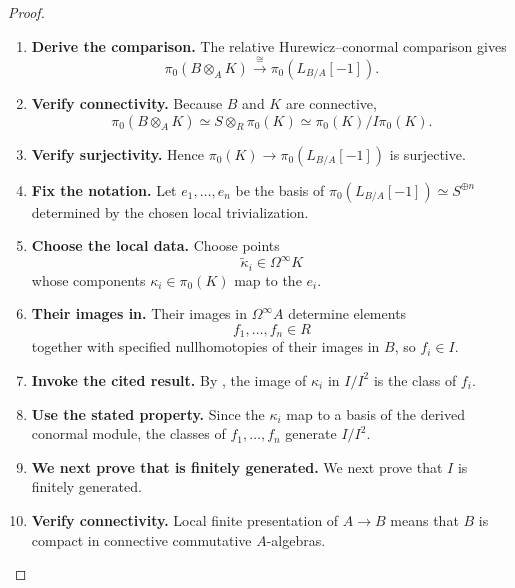 \begin{proof}
\begin{enumerate}[label=\textup{(\arabic*)}]
    \item \textbf{Derive the comparison.}
    The relative Hurewicz--conormal comparison gives
    \[
            \pi_0(B\otimes_AK)
            \xrightarrow{\cong}
            \pi_0(L_{B/A}[-1]).
        \]

    \item \textbf{Verify connectivity.}
    Because \(B\) and \(K\) are connective,
    \[
            \pi_0(B\otimes_AK)
            \simeq
            S\otimes_R\pi_0(K)
            \simeq
            \pi_0(K)/I\pi_0(K).
        \]

    \item \textbf{Verify surjectivity.}
    Hence \(\pi_0(K)\to\pi_0(L_{B/A}[-1])\) is surjective.

    \item \textbf{Fix the notation.}
    Let \(e_1,\ldots,e_n\) be the basis of \(\pi_0(L_{B/A}[-1])\simeq S^{\oplus n}\) determined by the chosen local trivialization.

    \item \textbf{Choose the local data.}
    Choose points
    \[
            \widetilde\kappa_i\in\Omega^\infty K
        \]
    whose components \(\kappa_i\in\pi_0(K)\) map to the \(e_i\).

    \item \textbf{Their images in.}
    Their images in \(\Omega^\infty A\) determine elements
    \[
            f_1,\ldots,f_n\in R
        \]
    together with specified nullhomotopies of their images in \(B\), so \(f_i\in I\).

    \item \textbf{Invoke the cited result.}
    By , the image of \(\kappa_i\) in \(I/I^2\) is
    the class of \(f_i\).

    \item \textbf{Use the stated property.}
    Since the \(\kappa_i\) map to a basis of the derived conormal module, the classes of
    \(f_1,\ldots,f_n\) generate \(I/I^2\).

    \item \textbf{We next prove that is finitely generated.}
    We next prove that \(I\) is finitely generated.

    \item \textbf{Verify connectivity.}
    Local finite presentation of \(A\to B\) means that \(B\) is compact in connective
    commutative \(A\)-algebras.


\end{enumerate}
\end{proof}
